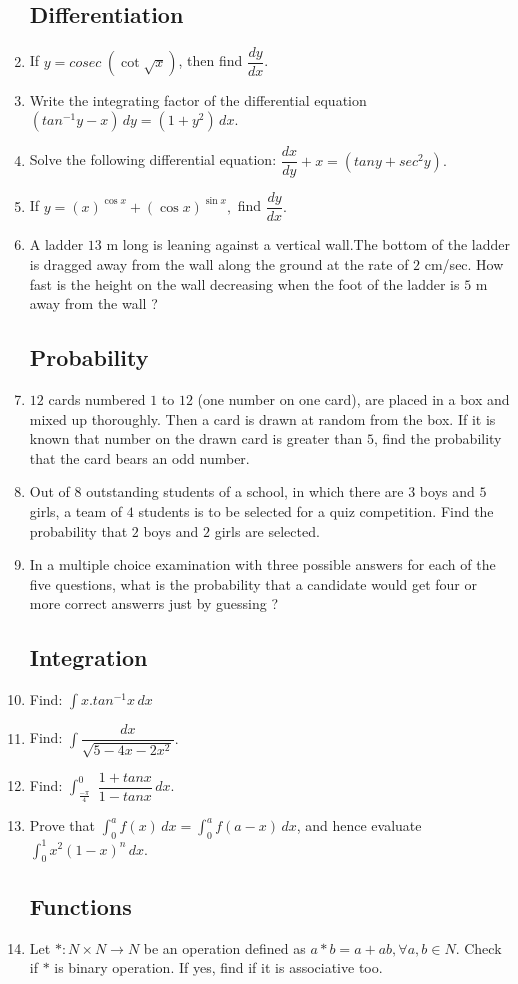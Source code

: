 \documentclass[10pt,-letter paper]{article}
\begin{document}
\begin{enumerate}
\subsection*{Differentiation}
\item If $y=cosec\hspace{3pt}(\cot\sqrt{x})$, then find $\dfrac{dy}{dx}$.
\item Write the integrating factor of the differential equation $(tan^{-1} y-x) \,dy=(1+y^{2}) \,dx$.
\item Solve the following differential equation: $\dfrac {dx}{dy}+x=(tan y + sec^{2} y).$
\item If $y=(x)^{\cos{x}}+{(\cos{x})}^{\sin{x}},$ find $\dfrac{dy}{dx}.$
\item A ladder $13$ m long is leaning against a vertical wall.The bottom of the ladder is dragged away from the wall along the ground at the rate of $2$ cm/sec. How fast is the height on the wall decreasing when the foot of the ladder is $5$ m away from the wall ?
\subsection*{Probability}
\item $12$ cards numbered $1$ to $12$ (one number on one card), are placed in a box and mixed up thoroughly. Then a card is drawn at random from the box. If it is known that number on the drawn card is greater than $5$, find the probability that the card bears an odd number.
\item Out of $8$ outstanding students of a school, in which there are $3$ boys and $5$ girls, a team of $4$ students is to be selected for a quiz competition. Find the probability that $2$ boys and $2$ girls are selected.
\item In a multiple choice examination with three possible answers for each of the five questions, what is the probability that a candidate would get four or more correct answerrs just by guessing ?
\subsection*{Integration}
\item Find: $\displaystyle \int x.tan^{-1} x \,dx$
\item Find: $\displaystyle \int \dfrac{dx}{\sqrt{5-4x-2x^{2}}}.$
\item Find: $\displaystyle \int_{\frac{-\pi}{4}}^{0}$ $\dfrac{1+tanx}{1-tanx} \,dx.$
\item Prove that $\int_{0}^{a}f(x) \,dx=\int_{0}^{a}f(a-x) \,dx$, and hence evaluate $\int_{0}^{1}x^{2}(1-x)^{n} \,dx.$
\subsection*{Functions}
\item Let $\ast : N \times N \rightarrow N$ be an operation defined as $a \ast b= a+ ab,\forall a,b \in N$. Check if $\ast$ is binary operation. If yes, find if it is associative too.
\end{enumerate}
\end{document}
